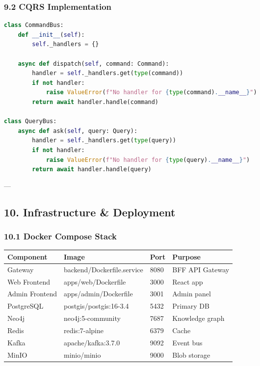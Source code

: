 \documentclass[11pt,a4paper]{article}
\begin{document}
\subsubsection{9.2 CQRS Implementation}

\begin{lstlisting}[language=python, caption=python code]
class CommandBus:
    def __init__(self):
        self._handlers = {}
    
    async def dispatch(self, command: Command):
        handler = self._handlers.get(type(command))
        if not handler:
            raise ValueError(f"No handler for {type(command).__name__}")
        return await handler.handle(command)

class QueryBus:
    async def ask(self, query: Query):
        handler = self._handlers.get(type(query))
        if not handler:
            raise ValueError(f"No handler for {type(query).__name__}")
        return await handler.handle(query)
\end{lstlisting}

---

\subsection{10. Infrastructure & Deployment}

\subsubsection{10.1 Docker Compose Stack}


\begin{table}[H]
\centering
\begin{tabular}{|l|l|l|l|}
\hline
Component & Image & Port & Purpose \\
\hline
Gateway & backend/Dockerfile.service & 8080 & BFF API Gateway \\
\hline
Web Frontend & apps/web/Dockerfile & 3000 & React app \\
\hline
Admin Frontend & apps/admin/Dockerfile & 3001 & Admin panel \\
\hline
PostgreSQL & postgis/postgis:16-3.4 & 5432 & Primary DB \\
\hline
Neo4j & neo4j:5-community & 7687 & Knowledge graph \\
\hline
Redis & redis:7-alpine & 6379 & Cache \\
\hline
Kafka & apache/kafka:3.7.0 & 9092 & Event bus \\
\hline
MinIO & minio/minio & 9000 & Blob storage \\
\hline
\end{tabular}
\end{table}
\end{document}
